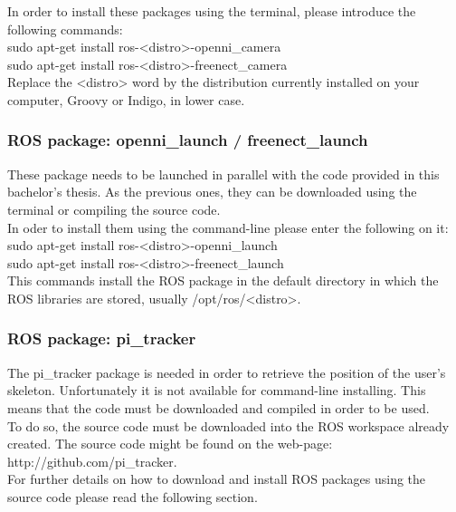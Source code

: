 In order to install these packages using the terminal, please introduce the following commands: 
\\

sudo apt-get install ros-<distro>-openni\_camera
\\

sudo apt-get install ros-<distro>-freenect\_camera
\\

Replace the <distro> word by the distribution currently installed on your computer, Groovy or Indigo, in lower case. 



\subsubsection{ROS package: openni\_launch / freenect\_launch}
These package needs to be launched in parallel with the code provided in this bachelor's thesis. As the previous ones, they can be downloaded using the terminal or compiling the source code. 
\\

In oder to install them using the command-line please enter the following on it: 
\\

sudo apt-get install ros-<distro>-openni\_launch
\\

sudo apt-get install ros-<distro>-freenect\_launch
\\

This commands install the ROS package in the default directory in which the ROS libraries are stored, usually /opt/ros/<distro>. 



\subsubsection{ROS package: pi\_tracker}
The pi\_tracker package is needed in order to retrieve the position of the user's skeleton. Unfortunately it is not available for command-line installing. This means that the code must be downloaded and compiled in order to be used. 
\\

To do so, the source code must be downloaded into the ROS workspace already created. The source code might be found on the web-page: http://github.com/pi\_tracker. 
\\

For further details on how to download and install ROS packages using the source code please read the following section. 

